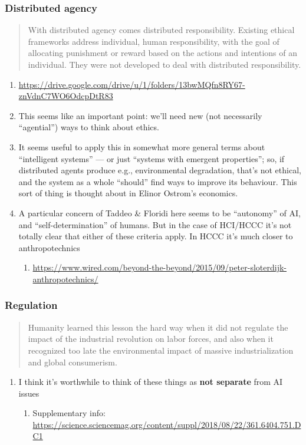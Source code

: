 \documentclass[11pt]{article}
\begin{document}
\subsubsection{Distributed agency}
\label{sec:org1c39207}
\begin{quote}
With distributed agency comes distributed responsibility. Existing ethical frameworks address individual, human responsibility, with the goal of allocating punishment or reward based on the actions and intentions of an individual. They were not developed to deal with distributed
responsibility.
\end{quote}
\begin{enumerate}
\item \url{https://drive.google.com/drive/u/1/folders/13bwMQfn8RY67-znVdnC7WO6OdcpDtR83}
\label{sec:org51e0373}
\item This seems like an important point: we'll need new (not necessarily ``agential'') ways to think about ethics.
\label{sec:orgc46ff7a}
\item It seems useful to apply this in somewhat more general terms about ``intelligent systems'' — or just ``systems with emergent properties''; so, if distributed agents produce e.g., environmental degradation, that's not ethical, and the system as a whole ``should'' find ways to improve its behaviour.  This sort of thing is thought about in Elinor Ostrom's economics.
\label{sec:orgf18c1d6}
\item A particular concern of Taddeo \& Floridi here seems to be ``autonomy'' of AI, and ``self-determination'' of humans. But in the case of HCI/HCCC it's not totally clear that either of these criteria apply.  In HCCC it's much closer to anthropotechnics
\label{sec:orgec1cbff}
\begin{enumerate}
\item \url{https://www.wired.com/beyond-the-beyond/2015/09/peter-sloterdijk-anthropotechnics/}
\label{sec:orge37b9c5}
\end{enumerate}
\end{enumerate}

\subsubsection{Regulation}
\label{sec:orgad14d11}
\begin{quote}
Humanity learned this lesson the hard way when it did not regulate the impact of the industrial revolution on labor forces, and also when it recognized too late the environmental impact of massive industrialization and global consumerism.
\end{quote}
\begin{enumerate}
\item I think it's worthwhile to think of these things as \textbf{not separate} from AI issues
\label{sec:orgd9a412b}
\begin{enumerate}
\item Supplementary info:
\label{sec:org688b83f}
\url{https://science.sciencemag.org/content/suppl/2018/08/22/361.6404.751.DC1}
\end{enumerate}
\end{enumerate}
\end{document}
